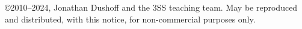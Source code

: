 \copyright 2010--2024, Jonathan Dushoff and the 3SS teaching team.  May be reproduced and distributed, with this notice, for non-commercial purposes only.
